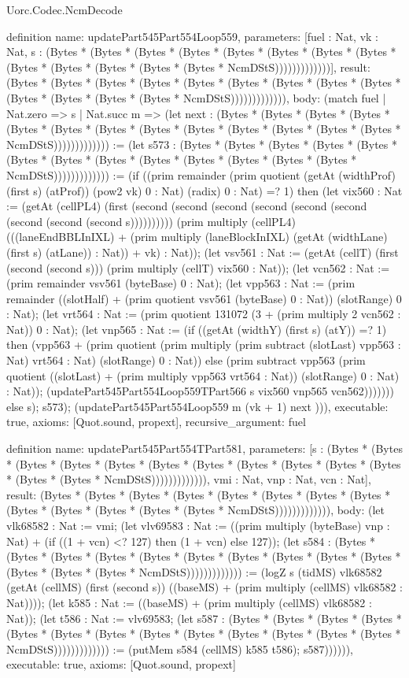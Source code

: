 \begin{lexlean}{Uorc.Codec.NcmDecode}
\begin{semanticmodule}
definition{
  name: updatePart545Part554Loop559,
  parameters: [fuel : Nat, vk : Nat, s : (Bytes * (Bytes * (Bytes * (Bytes * (Bytes * (Bytes * (Bytes * (Bytes * (Bytes * (Bytes * (Bytes * (Bytes * (Bytes * NcmDStS)))))))))))))],
  result: (Bytes * (Bytes * (Bytes * (Bytes * (Bytes * (Bytes * (Bytes * (Bytes * (Bytes * (Bytes * (Bytes * (Bytes * (Bytes * NcmDStS))))))))))))),
  body: (match fuel
    | Nat.zero => s
    | Nat.succ m => (let next : (Bytes * (Bytes * (Bytes * (Bytes * (Bytes * (Bytes * (Bytes * (Bytes * (Bytes * (Bytes * (Bytes * (Bytes * (Bytes * NcmDStS))))))))))))) := (let s573 : (Bytes * (Bytes * (Bytes * (Bytes * (Bytes * (Bytes * (Bytes * (Bytes * (Bytes * (Bytes * (Bytes * (Bytes * (Bytes * NcmDStS))))))))))))) := (if ((prim remainder (prim quotient (getAt (widthProf) (first s) (atProf)) (pow2 vk) 0 : Nat) (radix) 0 : Nat) =? 1) then (let vix560 : Nat := (getAt (cellPL4) (first (second (second (second (second (second (second (second (second (second s)))))))))) (prim multiply (cellPL4) (((laneEndBBLInIXL) + (prim multiply (laneBlockInIXL) (getAt (widthLane) (first s) (atLane)) : Nat)) + vk) : Nat)); (let vsv561 : Nat := (getAt (cellT) (first (second (second s))) (prim multiply (cellT) vix560 : Nat)); (let vcn562 : Nat := (prim remainder vsv561 (byteBase) 0 : Nat); (let vpp563 : Nat := (prim remainder ((slotHalf) + (prim quotient vsv561 (byteBase) 0 : Nat)) (slotRange) 0 : Nat); (let vrt564 : Nat := (prim quotient 131072 (3 + (prim multiply 2 vcn562 : Nat)) 0 : Nat); (let vnp565 : Nat := (if ((getAt (widthY) (first s) (atY)) =? 1) then (vpp563 + (prim quotient (prim multiply (prim subtract (slotLast) vpp563 : Nat) vrt564 : Nat) (slotRange) 0 : Nat)) else (prim subtract vpp563 (prim quotient ((slotLast) + (prim multiply vpp563 vrt564 : Nat)) (slotRange) 0 : Nat) : Nat)); (updatePart545Part554Loop559TPart566 s vix560 vnp565 vcn562))))))) else s); s573); (updatePart545Part554Loop559 m (vk + 1) next ))),
  executable: true,
  axioms: [Quot.sound, propext],
  recursive_argument: fuel
}

definition{
  name: updatePart545Part554TPart581,
  parameters: [s : (Bytes * (Bytes * (Bytes * (Bytes * (Bytes * (Bytes * (Bytes * (Bytes * (Bytes * (Bytes * (Bytes * (Bytes * (Bytes * NcmDStS))))))))))))), vmi : Nat, vnp : Nat, vcn : Nat],
  result: (Bytes * (Bytes * (Bytes * (Bytes * (Bytes * (Bytes * (Bytes * (Bytes * (Bytes * (Bytes * (Bytes * (Bytes * (Bytes * NcmDStS))))))))))))),
  body: (let vlk68582 : Nat := vmi; (let vlv69583 : Nat := ((prim multiply (byteBase) vnp : Nat) + (if ((1 + vcn) <? 127) then (1 + vcn) else 127)); (let s584 : (Bytes * (Bytes * (Bytes * (Bytes * (Bytes * (Bytes * (Bytes * (Bytes * (Bytes * (Bytes * (Bytes * (Bytes * (Bytes * NcmDStS))))))))))))) := (logZ s (tidMS) vlk68582 (getAt (cellMS) (first (second s)) ((baseMS) + (prim multiply (cellMS) vlk68582 : Nat)))); (let k585 : Nat := ((baseMS) + (prim multiply (cellMS) vlk68582 : Nat)); (let t586 : Nat := vlv69583; (let s587 : (Bytes * (Bytes * (Bytes * (Bytes * (Bytes * (Bytes * (Bytes * (Bytes * (Bytes * (Bytes * (Bytes * (Bytes * (Bytes * NcmDStS))))))))))))) := (putMem s584 (cellMS) k585 t586); s587)))))),
  executable: true,
  axioms: [Quot.sound, propext]
}


\end{semanticmodule}
\end{lexlean}
